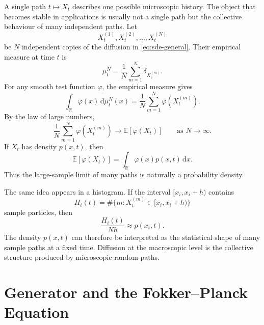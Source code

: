 \documentclass[11pt,a4paper]{article}
\numberwithin{equation}{section}
\newcommand{\R}{\mathbb{R}}
\newcommand{\E}{\mathbb{E}}
\newcommand{\dd}{\,\mathrm{d}}
\begin{document}
A single path \(t\mapsto X_t\) describes one possible microscopic history. The object that becomes stable in applications is usually not a single path but the collective behaviour of many independent paths. Let
\begin{equation}
  X_t^{(1)},X_t^{(2)},\ldots,X_t^{(N)}
  \label{eq:sample-paths}
\end{equation}
be \(N\) independent copies of the diffusion in \eqref{eq:sde-general}. Their empirical measure at time \(t\) is
\begin{equation}
  \mu_t^N
  =\frac{1}{N}\sum_{m=1}^{N}\delta_{X_t^{(m)}} .
  \label{eq:empirical-measure}
\end{equation}
For any smooth test function \(\varphi\), the empirical measure gives
\begin{equation}
  \int_{\R}\varphi(x)\dd\mu_t^N(x)
  =\frac{1}{N}\sum_{m=1}^{N}\varphi(X_t^{(m)}).
  \label{eq:empirical-test}
\end{equation}
By the law of large numbers,
\begin{equation}
  \frac{1}{N}\sum_{m=1}^{N}\varphi(X_t^{(m)})
  \longrightarrow
  \E[\varphi(X_t)]
  \qquad \text{as } N\to\infty .
  \label{eq:law-large-numbers}
\end{equation}
If \(X_t\) has density \(p(x,t)\), then
\begin{equation}
  \E[\varphi(X_t)]
  =\int_{\R}\varphi(x)p(x,t)\dd x .
  \label{eq:density-weak-form}
\end{equation}
Thus the large-sample limit of many paths is naturally a probability density.

The same idea appears in a histogram. If the interval \([x_i,x_i+h)\) contains
\begin{equation}
  H_i(t)=\#\{m:X_t^{(m)}\in[x_i,x_i+h)\}
  \label{eq:hist-count}
\end{equation}
sample particles, then
\begin{equation}
  \frac{H_i(t)}{Nh}\approx p(x_i,t).
  \label{eq:hist-density}
\end{equation}
The density \(p(x,t)\) can therefore be interpreted as the statistical shape of many sample paths at a fixed time. Diffusion at the macroscopic level is the collective structure produced by microscopic random paths.

\section{Generator and the Fokker--Planck Equation}
\end{document}
